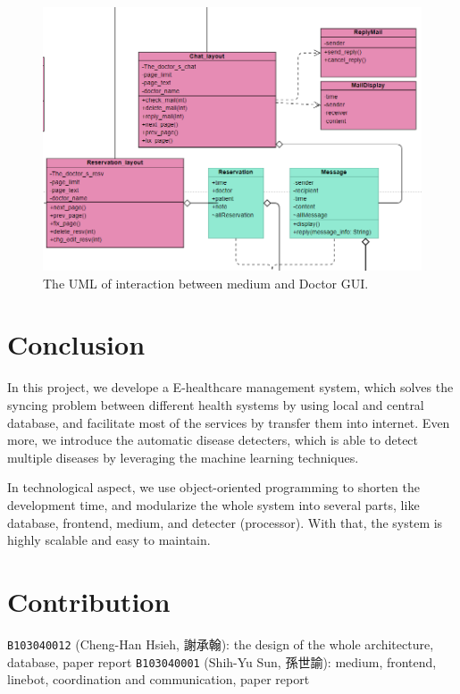 \documentclass{article}
\begin{document}
\begin{figure}[h]
  \centering
  \includegraphics[scale = 0.5]{asset/frontend_and_medium/MED_usage_doctor_gui.png}
  \caption{The UML of interaction between medium and Doctor GUI.}
  \label{fig:uml_medium_and_doctor_gui}
\end{figure}

\section{Conclusion}
\label{sec:conclusion}
In this project, we develope a E-healthcare management system, which solves 
the syncing problem between different health systems by using local and 
central database, and facilitate most of the services by transfer them into 
internet. Even more, we introduce the automatic disease detecters, which 
is able to detect multiple diseases by leveraging the machine learning 
techniques. 

In technological aspect, we use object-oriented programming to shorten the 
development time, and modularize the whole system into several parts, like 
database, frontend, medium, and detecter (processor). With that, the system 
is highly scalable and easy to maintain. 

\section{Contribution}
\label{sec:contribution}

\texttt{B103040012} (Cheng-Han Hsieh, 謝承翰): the design of the whole architecture, database, paper report
\texttt{B103040001} (Shih-Yu Sun, 孫世諭): medium, frontend, linebot, coordination and communication, paper report
\end{document}
